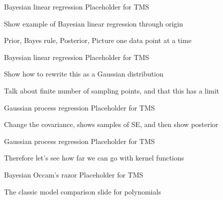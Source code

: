 \begin{frame}{Bayesian linear regression}
  Placeholder for TMS
  
  Show example of Bayesian linear regression through origin
  
  Prior, Bayes rule, Posterior, Picture one data point at a time
\end{frame}

\begin{frame}{Bayesian linear regression}
  Placeholder for TMS
  
  Show how to rewrite this as a Gaussian distribution
  
  Talk about finite number of sampling points, and that this has a limit
\end{frame}

\begin{frame}{Gaussian process regression}
  Placeholder for TMS
  
  Change the covariance, shows samples of SE, and then show posterior
\end{frame}


\begin{frame}{Gaussian process regression}
  Placeholder for TMS
  
  Therefore let's see how far we can go with kernel functions
\end{frame}

\begin{frame}{Bayesian Occam's razor}
  Placeholder for TMS
  
  The classic model comparison slide for polynomials
\end{frame}
